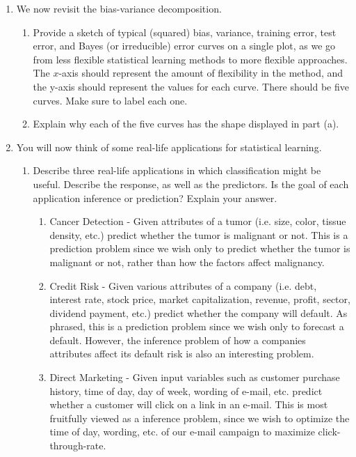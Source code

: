 \documentclass[11pt]{article}
\begin{document}
\begin{enumerate}
\item We now revisit the bias-variance decomposition.
\begin{enumerate}
\item Provide a sketch of typical (squared) bias, variance, training error, test error, and Bayes (or irreducible) error curves on a single plot, as we go from less flexible statistical learning methods to more flexible approaches.  The $x$-axis should represent the amount of flexibility in the method, and the y-axis should represent the values for each curve.  There should be five curves.  Make sure to label each one.
\item Explain why each of the five curves has the shape displayed in part (a).
\end{enumerate}

\item You will now think of some real-life applications for statistical learning.
\begin{enumerate}
\item Describe three real-life applications in which classification might be useful.  Describe the response, as well as the predictors.  Is the goal of each application inference or prediction? Explain your answer.
\begin{enumerate}
\item Cancer Detection - Given attributes of a tumor (i.e. size, color, tissue density, etc.) predict whether the tumor is malignant or not.  This is a prediction problem since we wish only to predict whether the tumor is malignant or not, rather than how the factors affect malignancy. 
\item Credit Risk - Given various attributes of a company (i.e. debt, interest rate, stock price, market capitalization, revenue, profit, sector, dividend payment, etc.) predict whether the company will default.  As phrased, this is a prediction problem since we wish only to forecast a default.  However, the inference problem of how a companies attributes affect its default risk is also an interesting problem.
\item Direct Marketing - Given input variables such as customer purchase history, time of day, day of week, wording of e-mail, etc.  predict whether a customer will click on a link in an e-mail.  This is most fruitfully viewed as a inference problem, since we wish to optimize the time of day, wording, etc. of our e-mail campaign to maximize click-through-rate.
\end{enumerate}


\end{enumerate}
\end{enumerate}
\end{document}
